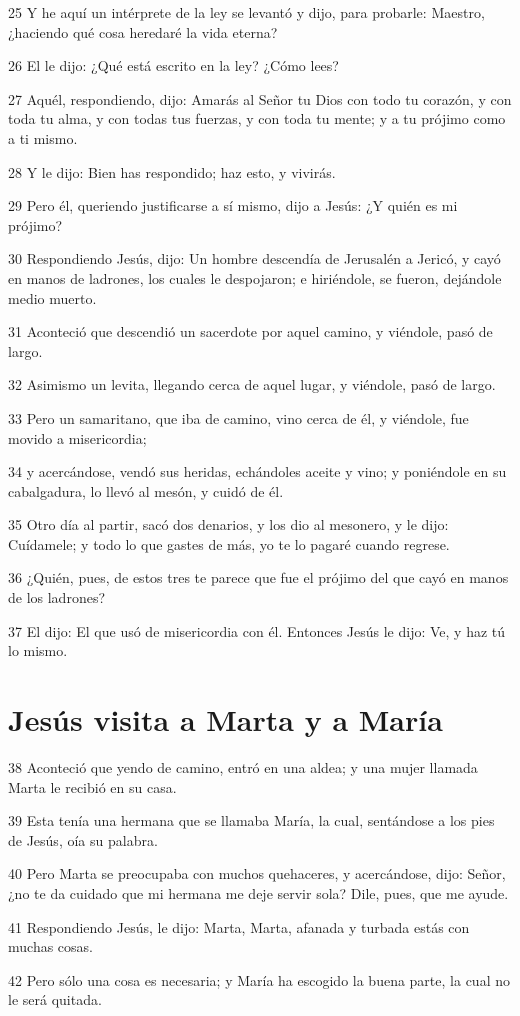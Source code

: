 \par 25 Y he aquí un intérprete de la ley se levantó y dijo, para probarle: Maestro, ¿haciendo qué cosa heredaré la vida eterna?
\par 26 El le dijo: ¿Qué está escrito en la ley? ¿Cómo lees?
\par 27 Aquél, respondiendo, dijo: Amarás al Señor tu Dios con todo tu corazón, y con toda tu alma, y con todas tus fuerzas, y con toda tu mente; y a tu prójimo como a ti mismo.
\par 28 Y le dijo: Bien has respondido; haz esto, y vivirás.
\par 29 Pero él, queriendo justificarse a sí mismo, dijo a Jesús: ¿Y quién es mi prójimo?
\par 30 Respondiendo Jesús, dijo: Un hombre descendía de Jerusalén a Jericó, y cayó en manos de ladrones, los cuales le despojaron; e hiriéndole, se fueron, dejándole medio muerto.
\par 31 Aconteció que descendió un sacerdote por aquel camino, y viéndole, pasó de largo.
\par 32 Asimismo un levita, llegando cerca de aquel lugar, y viéndole, pasó de largo.
\par 33 Pero un samaritano, que iba de camino, vino cerca de él, y viéndole, fue movido a misericordia;
\par 34 y acercándose, vendó sus heridas, echándoles aceite y vino; y poniéndole en su cabalgadura, lo llevó al mesón, y cuidó de él.
\par 35 Otro día al partir, sacó dos denarios, y los dio al mesonero, y le dijo: Cuídamele; y todo lo que gastes de más, yo te lo pagaré cuando regrese.
\par 36 ¿Quién, pues, de estos tres te parece que fue el prójimo del que cayó en manos de los ladrones?
\par 37 El dijo: El que usó de misericordia con él. Entonces Jesús le dijo: Ve, y haz tú lo mismo.

\section*{Jesús visita a Marta y a María}

\par 38 Aconteció que yendo de camino, entró en una aldea; y una mujer llamada Marta le recibió en su casa.
\par 39 Esta tenía una hermana que se llamaba María, la cual, sentándose a los pies de Jesús, oía su palabra.
\par 40 Pero Marta se preocupaba con muchos quehaceres, y acercándose, dijo: Señor, ¿no te da cuidado que mi hermana me deje servir sola? Dile, pues, que me ayude.
\par 41 Respondiendo Jesús, le dijo: Marta, Marta, afanada y turbada estás con muchas cosas.
\par 42 Pero sólo una cosa es necesaria; y María ha escogido la buena parte, la cual no le será quitada.


